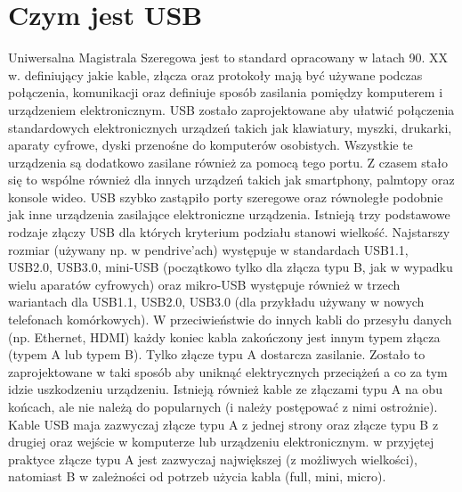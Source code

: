 \documentclass{BscUS}
\begin{document}
\section{Czym jest USB}
\label{USBStandardChapter}
Uniwersalna Magistrala Szeregowa jest to standard opracowany w latach 90. XX w. definiujący jakie kable, złącza oraz protokoły mają być używane podczas połączenia, komunikacji oraz definiuje sposób zasilania pomiędzy komputerem i urządzeniem elektronicznym. USB zostało zaprojektowane aby ułatwić połączenia standardowych elektronicznych urządzeń takich jak klawiatury, myszki, drukarki, aparaty cyfrowe, dyski przenośne do komputerów osobistych. Wszystkie te urządzenia są dodatkowo zasilane również za pomocą tego portu. Z czasem stało się to wspólne również dla innych urządzeń takich jak smartphony, palmtopy oraz konsole wideo.\cite{USBSystemArch, USB20Doc, USB30Doc}
\newline
\indent USB szybko zastąpiło porty szeregowe oraz równoległe podobnie jak inne urządzenia zasilające elektroniczne urządzenia.
\indent Istnieją trzy podstawowe rodzaje złączy USB dla których kryterium podziału stanowi wielkość. Najstarszy rozmiar (używany np. w pendrive'ach) występuje w standardach USB1.1, USB2.0, USB3.0, mini-USB (początkowo tylko dla złącza typu B, jak w wypadku wielu aparatów cyfrowych) oraz mikro-USB występuje również w trzech wariantach dla USB1.1, USB2.0, USB3.0 (dla przykładu używany w nowych telefonach komórkowych). 
\newline
\indent W przeciwieństwie do innych kabli do przesyłu danych (np. Ethernet, HDMI) każdy koniec kabla zakończony jest innym typem złącza (typem A lub typem B). Tylko złącze typu A dostarcza zasilanie. Zostało to zaprojektowane w taki sposób aby uniknąć elektrycznych przeciążeń a co za tym idzie uszkodzeniu urządzeniu. Istnieją również kable ze złączami typu A na obu końcach, ale nie należą do popularnych (i należy postępować z nimi ostrożnie). Kable USB maja zazwyczaj złącze typu A z jednej strony oraz złącze typu B z drugiej oraz wejście w komputerze lub urządzeniu elektronicznym. w przyjętej praktyce złącze typu A jest zazwyczaj największej (z możliwych wielkości), natomiast B w zależności od potrzeb użycia kabla (full, mini, micro). \cite{USBSystemArch, USB20Doc, USB30Doc}
\end{document}
